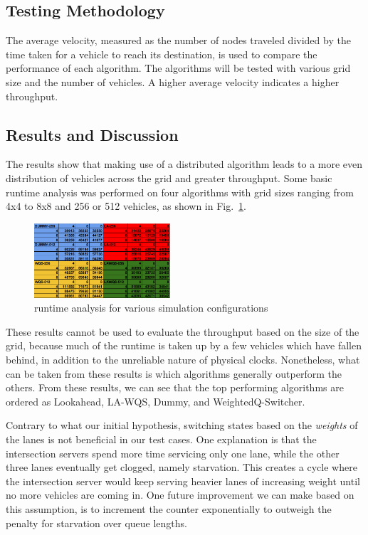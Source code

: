 \documentclass[conference]{IEEEtran}
\begin{document}
\subsection{Testing Methodology}
The average velocity, measured as the number of nodes traveled divided by the time taken for a vehicle to reach its destination, is used to compare the performance of each algorithm. The algorithms will be tested with various grid size and the number of vehicles. A higher average velocity indicates a higher throughput.

\subsection{Results and Discussion}
The results show that making use of a distributed algorithm leads to a more even distribution of vehicles across the grid and greater throughput. Some basic runtime analysis was performed on four algorithms with grid sizes ranging from 4x4 to 8x8 and 256 or 512 vehicles, as shown in Fig.~\ref{simulation_duration}.

\begin{figure}[h]
    \center    
    \includegraphics[width=0.45\textwidth]{images/simulation_duration.png}
	\caption{runtime analysis for various simulation configurations}
	\label{simulation_duration}
\end{figure}


These results cannot be used to evaluate the throughput based on the size of the grid, because much of the runtime is taken up by a few vehicles which have fallen behind, in addition to the unreliable nature of physical clocks. Nonetheless, what can be taken from these results is which algorithms  generally outperform the others. From these results, we can see that the top performing algorithms are ordered as Lookahead, LA-WQS, Dummy, and WeightedQ-Switcher. 

Contrary to what our initial hypothesis, switching states based on the {\it weights} of the lanes is not beneficial in our test cases. One explanation is that the intersection servers spend more time servicing only one lane, while the other three lanes eventually get clogged, namely starvation. This creates a cycle where the intersection server would keep serving heavier lanes of increasing weight until no more vehicles are coming in. One future improvement we can make based on this assumption, is to increment the counter exponentially to outweigh the penalty for starvation over queue lengths.
\end{document}
